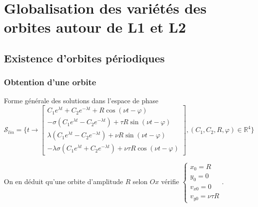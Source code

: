 \documentclass{beamer}
\begin{document}
	
	
	

	
	\section[Variétés autour de L1 et L2]{Globalisation des variétés des orbites autour de L1 et L2}
	\subsection{Existence d'orbites périodiques}
	
	\begin{frame}
		\frametitle{Obtention d'une orbite}
		\begin{importantresult}{Forme générale des solutions dans l'espace de phase}
			{\scriptsize
			\begin{equation}
				\mathcal{S}_{lin} = \{ t \to
				\begin{bmatrix}
					C_1e^{\lambda t} + C_2e^{-\lambda t} + R\cos(\nu t - \varphi)
					\\
					-\sigma (C_1e^{\lambda t} - C_2e^{-\lambda t}) +  \tau R\sin(\nu t - \varphi)
					\\
					\lambda (C_1e^{\lambda t} - C_2e^{-\lambda t}) + \nu R\sin(\nu t - \varphi)
					\\
					-\lambda\sigma (C_1e^{\lambda t} + C_2e^{-\lambda t}) + \nu\tau R\cos(\nu t - \varphi)
				\end{bmatrix},
				(C_1,C_2,R,\varphi) \in \mathbb{R}^4
				\}
			\end{equation}
			}
		\end{importantresult}
		
		\bigskip
		
		\pause
		
		{\footnotesize	
		On en déduit qu'une orbite d'amplitude $R$ selon $Ox$ vérifie	
		$
			\begin{cases}
				x_0 = R
				\\
				y_0 = 0
				\\
				v_{x0} = 0
				\\
				v_{y0} = \nu\tau R
			\end{cases}
		$.}
		
	\end{frame}
	
\end{document}
